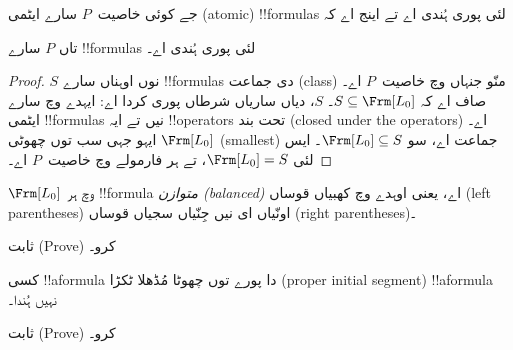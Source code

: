 \documentclass[../../../include/open-logic-section]{subfiles}
\begin{document}


\begin{thm}
  جے کوئی خاصیت~$P$ سارے ایٹمی (atomic) !!{formula}s لئی پوری ہُندی اے تے
  اینج اے کہ
  \begin{enumerate}
  \end{enumerate}
  تاں $P$ سارے !!{formula}s لئی پوری ہُندی اے۔
\end{thm}

\begin{proof}
  $S$ نوں اوہناں سارے !!{formula}s دی جماعت (class) منّو جنہاں وچ
  خاصیت~$P$ اے۔ صاف اے کہ $S \subseteq \Frm[L_0]$۔ $S$،
   دیاں ساریاں شرطاں پوری کردا اے: ایہدے وچ
  سارے ایٹمی !!{formula}s نیں تے ایہ !!{operator}s تحت بند (closed
  under the operators) اے۔ $\Frm[L_0]$ ایہو جہی سب توں چھوٹی
  (smallest) جماعت اے، سو
  $\Frm[L_0] \subseteq S$۔ ایس لئی $\Frm[L_0] = S$، تے ہر فارمولے
  وچ خاصیت~$P$ اے۔
\end{proof}

\begin{prop}
   $\Frm[L_0]$ وچ ہر !!{formula} \emph{متوازن (balanced)} اے، یعنی اوہدے وچ
   کھبیاں قوساں (left parentheses) اونّیاں ای نیں جِنّیاں سجیاں
   قوساں (right parentheses)۔
\end{prop}

\begin{prob}
 ثابت (Prove) کرو۔
\end{prob}

\begin{prop} 
کسی !!a{formula} دا پورے توں چھوٹا مُڈھلا ٹکڑا (proper initial
segment) !!a{formula} نہیں ہُندا۔
\end{prop}

\begin{prob}
   ثابت (Prove) کرو۔
\end{prob}
\end{document}
